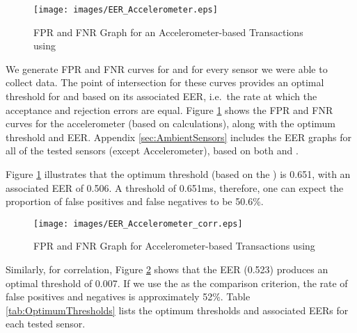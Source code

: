 \documentclass{article}
\begin{document}
\begin{figure}[ht]
	\centering
		\texttt{[image: images/EER\_Accelerometer.eps]}
	\caption{FPR and FNR Graph for an Accelerometer-based Transactions using }
	\label{fig:EERAmbientSensor}
\end{figure}

We generate FPR and FNR curves for  and  for every sensor we were able to collect data.  The point of intersection for these curves provides an optimal threshold for  and  based on its associated EER, i.e.\ the rate at which the acceptance and rejection errors are equal. Figure \ref{fig:EERAmbientSensor} shows the FPR and FNR curves for the accelerometer (based on  calculations), along with the optimum threshold and EER\@. Appendix \ref{sec:AmbientSensors} includes the EER graphs for all of the tested sensors (except Accelerometer), based on both  and . 

Figure \ref{fig:EERAmbientSensor} illustrates that the optimum threshold (based on the ) is 0.651, with an associated EER of 0.506.  A threshold of 0.651ms, therefore, one can expect the proportion of false positives and false negatives to be 50.6\%.

\begin{figure}[ht]
	\centering
		\texttt{[image: images/EER\_Accelerometer\_corr.eps]}
	\caption{FPR and FNR Graph for Accelerometer-based Transactions using }
	\label{fig:EERAmbientSensorcorr}
\end{figure}

Similarly, for correlation, Figure \ref{fig:EERAmbientSensorcorr} shows that the EER (0.523) produces an optimal threshold of 0.007.  If we use the  as the comparison criterion, the rate of false positives and negatives is approximately 52\%.  Table \ref{tab:OptimumThresholds} lists the optimum thresholds and associated EERs for each tested sensor. 
\end{document}
